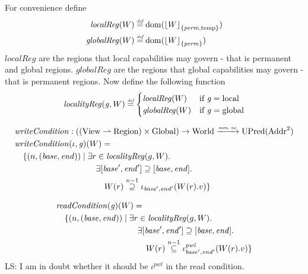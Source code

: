 \documentclass[a4paper]{article}
\DeclarePairedDelimiter\floor{\lfloor}{\rfloor}
\newcommand{\monnefun}{\xrightarrow{\textit{\tiny{mon, ne}}}}
\newcommand{\fun}{\rightarrow}
\newcommand{\defeq}{\stackrel{\textit{\tiny{def}}}{=}}
\newcommand{\nsubeq}[1][n]{\stackrel{\tiny{#1}}{\subseteq}}
\newcommand{\nsupeq}[1][n]{\stackrel{\tiny{#1}}{\supseteq}}
\DeclareMathOperator{\dom}{dom}
\newcommand\lau[1]{{\color{purple} \sf \footnotesize {LS: #1}}\\}
\newcommand{\var}[1]{\mathit{#1}}
\newcommand{\gl}{\var{g}}
\newcommand{\start}{\var{base}}
\newcommand{\addrend}{\var{end}}
\newcommand{\perm}{\var{perm}}
\newcommand{\plainfun}[2]{
  \ifthenelse{\equal{#2}{}}
             {\mathit{#1}}
             {\mathit{#1}(#2)}
}
\newcommand{\readCond}[1]{\plainfun{readCondition}{#1}}
\newcommand{\writeCond}[1]{\plainfun{writeCondition}{#1}}
\newcommand{\erase}[2]{\floor*{#1}_{\{#2\}}}
\newcommand{\plaindom}[1]{\mathrm{#1}}
\newcommand{\Addrs}{\plaindom{Addr}}
\newcommand{\Globals}{\plaindom{Global}}
\newcommand{\Regions}{\plaindom{Region}}
\newcommand{\Worlds}{\plaindom{World}}
\newcommand{\UPred}[1]{\plaindom{UPred}(#1)}
\newcommand{\Views}{\plaindom{View}}
\newcommand{\npair}[2][n]{\left(#1,#2 \right)}
\newcommand{\plainperm}[1]{\mathrm{#1}}
\newcommand{\local}{\plainperm{local}}
\newcommand{\glob}{\plainperm{global}}
\newcommand{\localReg}{\var{localReg}}
\newcommand{\globalReg}{\var{globalReg}}
\newcommand{\plainview}[1]{\mathrm{#1}}
\newcommand{\temp}{\plainview{temp}}
\begin{document}
For convenience define
\begin{align*}
  \localReg(W) & \defeq \dom(\erase{W}{\perm,\temp}) \\
  \globalReg(W) & \defeq \dom(\erase{W}{\perm})
\end{align*}
$\localReg$ are the regions that local capabilities may govern - that is permanent and global regions. $\globalReg$ are the regions that global capabilities may govern - that is permanent regions. Now define the following function
\[
  \var{localityReg}(\gl,W) \defeq 
  \begin{cases}
    \localReg(W) & \text{if } \gl = \local \\
    \globalReg(W) & \text{if } \gl = \glob
  \end{cases}
\]

\begin{align*}
    & \writeCond{} : ((\Views \rightharpoonup \Regions) \times \Globals) \fun \Worlds \monnefun \UPred{\Addrs^2}  \\
    & \writeCond{}(\iota,\gl)(W) =  \\
    & \quad \begin{aligned}[t]
              \{ \npair{(\start,\addrend)} \mid & \;\exists r \in \var{localityReg}(g,W) \ldotp \\
              & \;\quad \exists [\start',\addrend'] \supseteq [\start,\addrend] \ldotp \\
              & \;\qquad W(r)\nsupeq[n-1] \iota_{\start',\addrend'}(W(r).v) \}
            \end{aligned}
\end{align*}

\begin{align*}
    & \readCond{}(\gl)(W) =  \\
    & \quad \begin{aligned}[t]
              \{ \npair{(\start,\addrend)} \mid & \;\exists r \in \var{localityReg}(g,W) \ldotp \\
                        & \;\quad \exists [\start',\addrend'] \supseteq [\start,\addrend] \ldotp \\
                        & \;\qquad W(r)\nsubeq[n-1] \iota^{\var{pwl}}_{\start',\addrend'}(W(r).v) \}
            \end{aligned}
\end{align*}
\lau{I am in doubt whether it should be $\iota^{\var{pwl}}$ in the read condition.}
\end{document}
